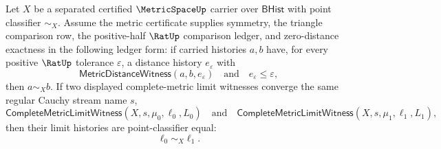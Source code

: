 \begin{theorem}
\label{thm:completemetric-limit-witness-uniqueness}
Let $X$ be a separated certified $\MetricSpaceUp$ carrier over $\mathsf{BHist}$
with point classifier $\sim_X$. Assume the metric certificate supplies symmetry,
the triangle comparison row, the positive-half $\RatUp$ comparison ledger, and
zero-distance exactness in the following ledger form: if carried histories $a,b$
have, for every positive $\RatUp$ tolerance $\varepsilon$, a distance history
$e_{\varepsilon}$ with
$$
\mathsf{MetricDistanceWitness}(a,b,e_{\varepsilon})
\quad\text{and}\quad
 e_{\varepsilon}\leq\varepsilon,
$$
then $a\sim_X b$. If two displayed complete-metric limit witnesses converge the
same regular Cauchy stream name $s$,
$$
\mathsf{CompleteMetricLimitWitness}(X,s,\mu_0,\ell_0,L_0)
\quad\text{and}\quad
\mathsf{CompleteMetricLimitWitness}(X,s,\mu_1,\ell_1,L_1),
$$
then their limit histories are point-classifier equal:
$$
\ell_0\sim_X\ell_1.
$$
\end{theorem}

